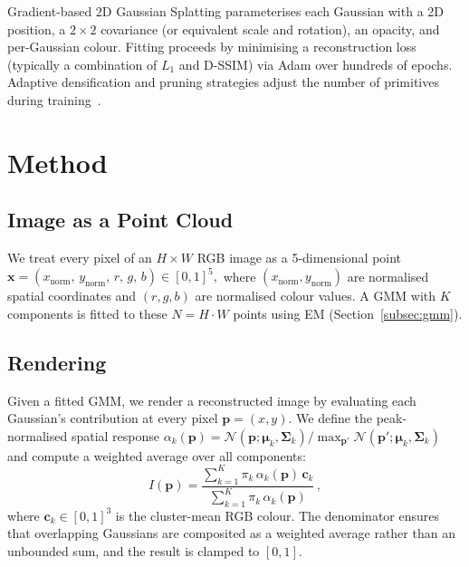 \documentclass[a4paper,conference]{IEEEtran}
\begin{document}
Gradient-based 2D Gaussian Splatting parameterises each Gaussian with a
2D position, a $2\!\times\!2$ covariance (or equivalent scale and rotation),
an opacity, and per-Gaussian colour.
Fitting proceeds by minimising a reconstruction loss (typically a combination
of $L_1$ and D-SSIM) via Adam over hundreds of epochs.
Adaptive densification and pruning strategies adjust the number of
primitives during training~\cite{kerbl3Dgaussians}.


\section{Method}
\label{sec:method}

\subsection{Image as a Point Cloud}
\label{subsec:data}

We treat every pixel of an $H\!\times\!W$ RGB image as a 5-dimensional point
$\mathbf{x} = (x_{\mathrm{norm}},\, y_{\mathrm{norm}},\, r,\, g,\, b) \in [0,1]^5,$
where $(x_{\mathrm{norm}}, y_{\mathrm{norm}})$ are normalised spatial coordinates
and $(r,g,b)$ are normalised colour values.
A GMM with $K$ components is fitted to these $N = H\!\cdot\!W$ points
using EM (Section~\ref{subsec:gmm}).

\subsection{Rendering}
\label{subsec:rendering}

Given a fitted GMM, we render a reconstructed image by evaluating each
Gaussian's contribution at every pixel $\mathbf{p}=(x,y)$.
We define the peak-normalised spatial response
$\alpha_k(\mathbf{p}) = \mathcal{N}(\mathbf{p};\boldsymbol{\mu}_k,\boldsymbol{\Sigma}_k) / \max_{\mathbf{p}'}\mathcal{N}(\mathbf{p}';\boldsymbol{\mu}_k,\boldsymbol{\Sigma}_k)$
and compute a weighted average over all components:
\begin{equation}
  I(\mathbf{p}) = \frac{\sum_{k=1}^{K} \pi_k \, \alpha_k(\mathbf{p}) \, \mathbf{c}_k}
                       {\sum_{k=1}^{K} \pi_k \, \alpha_k(\mathbf{p})} \,,
  \label{eq:render}
\end{equation}
where $\mathbf{c}_k \in [0,1]^3$ is the cluster-mean RGB colour.
The denominator ensures that overlapping Gaussians are composited as
a weighted average rather than an unbounded sum, and the result is
clamped to $[0,1]$.
\end{document}
